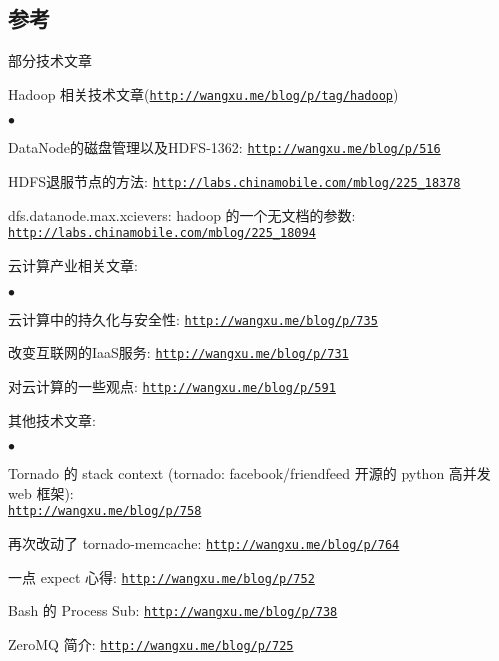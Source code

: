 \documentclass[margin,line]{res}
\newenvironment{list1}{
  \begin{list}{\ding{113}}{%
      \setlength{\itemsep}{0in}
      \setlength{\parsep}{0in} \setlength{\parskip}{0in}
      \setlength{\topsep}{0in} \setlength{\partopsep}{0in} 
      \setlength{\leftmargin}{0.17in}}}{\end{list}}
\newenvironment{list2}{
  \begin{list}{$\bullet$}{%
      \setlength{\itemsep}{0in}
      \setlength{\parsep}{0in} \setlength{\parskip}{0in}
      \setlength{\topsep}{0in} \setlength{\partopsep}{0in} 
      \setlength{\leftmargin}{0.2in}}}{\end{list}}
\newcommand{\http}{http:/\hspace{-0.3ex}/}
\newcommand{\hindent}{\mbox{\hspace{8ex}}}
\begin{document}
\begin{resume}
\section{参考}
\textsf{部分技术文章}\\
\vspace*{-.1in}
\begin{list1}
\item[] Hadoop 相关技术文章(\href{http://wangxu.me/blog/p/tag/hadoop}{\tt\http{}wangxu.me/blog/p/tag/hadoop})
\begin{list2}
\vspace*{.05in}
\item DataNode的磁盘管理以及HDFS-1362: \href{http://wangxu.me/blog/p/516}{\tt\http{}wangxu.me/blog/p/516}
\item HDFS退服节点的方法: \href{http://labs.chinamobile.com/mblog/225_18378}{\tt\http{}labs.chinamobile.com/mblog/225\_18378}
\item dfs.datanode.max.xcievers: hadoop 的一个无文档的参数: \\
	\hindent\href{http://labs.chinamobile.com/mblog/225_18094}{\tt\http{}labs.chinamobile.com/mblog/225\_18094}
\vspace*{.05in}
\end{list2}
\item[] 云计算产业相关文章:
\begin{list2}
\vspace*{.05in}
\item 云计算中的持久化与安全性: \href{http://wangxu.me/blog/p/735}{\tt\http{}wangxu.me/blog/p/735}
\item 改变互联网的IaaS服务: \href{http://wangxu.me/blog/p/731}{\tt\http{}wangxu.me/blog/p/731}
\item 对云计算的一些观点: \href{http://wangxu.me/blog/p/591}{\tt\http{}wangxu.me/blog/p/591}
\vspace*{.05in}
\end{list2}
\item[] 其他技术文章:
\begin{list2}
\vspace*{.05in}
\item Tornado 的 stack context (tornado: facebook/friendfeed 开源的 python 高并发 web 框架):\\
  \hindent\href{http://wangxu.me/blog/p/758}{\tt\http{}wangxu.me/blog/p/758}
\item 再次改动了 tornado-memcache: \href{http://wangxu.me/blog/p/764}{\tt\http{}wangxu.me/blog/p/764}
\item 一点 expect 心得: \href{http://wangxu.me/blog/p/752}{\tt\http{}wangxu.me/blog/p/752}
\item Bash 的 Process Sub: \href{http://wangxu.me/blog/p/738}{\tt\http{}wangxu.me/blog/p/738}
\item ZeroMQ 简介: \href{http://wangxu.me/blog/p/725}{\tt\http{}wangxu.me/blog/p/725}


\end{list2}
\end{list1}
\end{resume}
\end{document}
